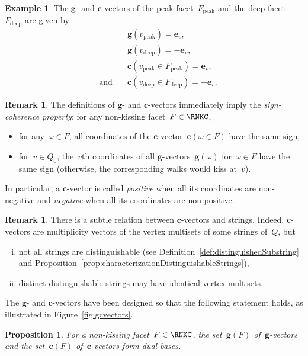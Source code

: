 \documentclass{memo-l}
\newtheorem{proposition}[theorem]{Proposition}
\theoremstyle{definition}
\newtheorem{example}[theorem]{Example}
\newtheorem{remark}[theorem]{Remark}
\renewcommand{\b}[1]{\mathbf{#1}} %
\newcommand{\fref}[1]{Figure~\ref{#1}} %
\newcommand{\darkblue}{\color{darkblue}} %
\newcommand{\defn}[1]{\textsl{\darkblue #1}} %
\newcommand{\peak}{\mathrm{peak}} %
\newcommand{\deep}{\mathrm{deep}} %
\newcommand{\gvector}[1]{\mathbf{g}(#1)} %
\newcommand{\gvectors}[1]{\mathbf{g}(#1)} %
\newcommand{\cvector}[2]{\mathbf{c}(#1 \in #2)} %
\newcommand{\cvectors}[1]{\mathbf{c}(#1)} %
\begin{document}
\begin{example}
\label{exm:gcvectors}
The $\b{g}$- and $\b{c}$-vectors of the peak facet~$F_\peak$ and the deep facet~$F_\deep$ are given by
\begin{align*}
&\gvector{v_\peak} = \b{e}_v, \\ 
&\gvector{v_\deep} = -\b{e}_v, \\
&\cvector{v_\peak}{F_\peak} = \b{e}_v, \\
\quad\text{and}\quad
&\cvector{v_\deep}{F_\deep} = -\b{e}_v.
\end{align*}
\end{example}

\begin{remark}
\label{rem:signCoherence}
The definitions of $\b{g}$- and $\b{c}$-vectors immediately imply the \defn{sign-coherence property}: for any non-kissing facet~$F \in \RNKC$,
\begin{itemize}
\item for any~$\omega \in F$, all coordinates of the $\b{c}$-vector~$\cvector{\omega}{F}$ have the same sign,
\item for~$v \in Q_0$, the~$v$th coordinates of all $\b{g}$-vectors~$\gvector{\omega}$ for~$\omega \in F$ have the same sign (otherwise, the corresponding walks would kiss at~$v$).
\end{itemize}
In particular, a $\b{c}$-vector is called \defn{positive} when all its coordinates are non-negative and \defn{negative} when all its coordinates are non-positive.
\end{remark}

\begin{remark}
\label{rem:setcvectors}
There is a subtle relation between $\b{c}$-vectors and strings. Indeed, $\b{c}$-vectors are multiplicity vectors of the vertex multisets of some strings of~$\bar Q$, but
\begin{enumerate}[(i)]
\item not all strings are distinguishable (see Definition~\ref{def:distinguishedSubstring} and Proposition~\ref{prop:characterizationDistinguishableStrings}),
\item distinct distinguishable strings may have identical vertex multisets.
\end{enumerate}
\end{remark}

The $\b{g}$- and $\b{c}$-vectors have been designed so that the following statement holds, as illustrated in \fref{fig:gcvectors}.

\begin{proposition}
\label{prop:gvectorscvectorsDualBases}
For a non-kissing facet~$F \in \RNKC$, the set~$\gvectors{F}$ of~$\b{g}$-vectors and the set~$\cvectors{F}$ of~$\b{c}$-vectors form dual bases. 
\end{proposition}
\end{document}
